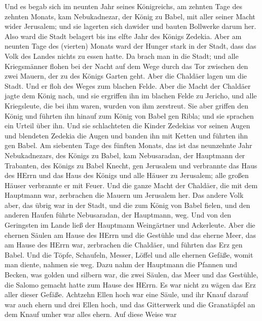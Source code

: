  Und es begab sich im neunten Jahr seines Königreichs, am
zehnten Tage des zehnten Monats, kam Nebukadnezar, der König zu Babel,
mit aller seiner Macht wider Jerusalem; und sie lagerten sich dawider
und bauten Bollwerke darum her.  Also ward die Stadt
belagert bis ins elfte Jahr des Königs Zedekia.  Aber am
neunten Tage des (vierten) Monats ward der Hunger stark in der Stadt,
dass das Volk des Landes nichts zu essen hatte.  Da brach
man in die Stadt; und alle Kriegsmänner flohen bei der Nacht auf dem
Wege durch das Tor zwischen den zwei Mauern, der zu des Königs Garten
geht. Aber die Chaldäer lagen um die Stadt. Und er floh des Weges zum
blachen Felde.  Aber die Macht der Chaldäer jagte dem König
nach, und sie ergriffen ihn im blachen Felde zu Jericho, und alle
Kriegsleute, die bei ihm waren, wurden von ihm zerstreut. 
Sie aber griffen den König und führten ihn hinauf zum König von Babel
gen Ribla; und sie sprachen ein Urteil über ihn.  Und sie
schlachteten die Kinder Zedekias vor seinen Augen und blendeten Zedekia
die Augen und banden ihn mit Ketten und führten ihn gen Babel.
 Am siebenten Tage des fünften Monats, das ist das
neunzehnte Jahr Nebukadnezars, des Königs zu Babel, kam Nebusaradan, der
Hauptmann der Trabanten, des Königs zu Babel Knecht, gen Jerusalem
 und verbrannte das Haus des HErrn und das Haus des Königs
und alle Häuser zu Jerusalem; alle großen Häuser verbrannte er mit
Feuer.  Und die ganze Macht der Chaldäer, die mit dem
Hauptmann war, zerbrachen die Mauern um Jerusalem her.  Das
andere Volk aber, das übrig war in der Stadt, und die zum König von
Babel fielen, und den anderen Haufen führte Nebusaradan, der Hauptmann,
weg.  Und von den Geringsten im Lande ließ der Hauptmann
Weingärtner und Ackerleute.  Aber die ehernen Säulen am
Hause des HErrn und die Gestühle und das eherne Meer, das am Hause des
HErrn war, zerbrachen die Chaldäer, und führten das Erz gen Babel.
 Und die Töpfe, Schaufeln, Messer, Löffel und alle ehernen
Gefäße, womit man diente, nahmen sie weg.  Dazu nahm der
Hauptmann die Pfannen und Becken, was golden und silbern war,
 die zwei Säulen, das Meer und das Gestühle, die Salomo
gemacht hatte zum Hause des HErrn. Es war nicht zu wägen das Erz aller
dieser Gefäße.  Achtzehn Ellen hoch war eine Säule, und ihr
Knauf darauf war auch ehern und drei Ellen hoch, und das Gitterwerk und
die Granatäpfel an dem Knauf umher war alles ehern. Auf diese Weise war
